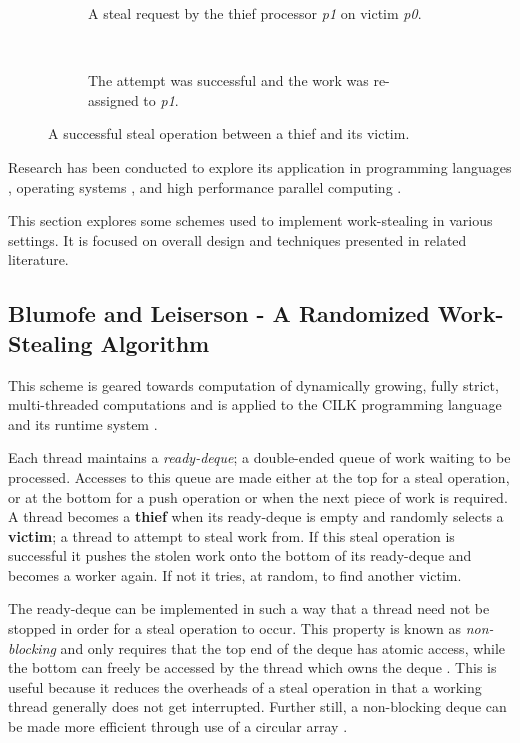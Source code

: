 \begin{figure}[h]
\centering
\begin{subfigure}[b]{0.4\textwidth}
  \centering    
  
  \caption{
    \tiny A steal request by the thief processor \textit{p1} on victim \textit{p0}.
  }
  \label{fig:stealreq}
\end{subfigure}
~~~~~~ %
\begin{subfigure}[b]{0.4\textwidth}
  \centering
  
  \caption{
    \tiny The attempt was successful and the work was re-assigned to \textit{p1}.
  }
  \label{fig:stealsuccess}
\end{subfigure}
\caption{
    A successful steal operation between a thief and its victim.
  }
\label{fig:stealoperation}
\end{figure}

Research has been conducted to explore its application in programming languages \cite{}, 
operating systems \cite{}, and high performance parallel computing \cite{}.

This section explores some schemes used to implement work-stealing in various settings. It is focused on overall design and 
techniques presented in related literature. 

\subsection*{Blumofe and Leiserson - A Randomized Work-Stealing Algorithm}
\label{sec:randscheme}

This scheme is geared towards computation of dynamically growing, fully strict, multi-threaded computations and is applied to the CILK
programming language and its runtime system \cite{blumleis}. 

Each thread maintains a \textit{ready-deque}; a double-ended queue of work waiting to be processed. 
Accesses to this queue are made either at the top for a steal operation, or at the bottom for a push operation
or when the next piece of work is required.
A thread becomes a \textbf{thief} when its ready-deque is empty and randomly selects a \textbf{victim}; a thread
to attempt to steal work from. If this steal operation is successful it pushes the stolen work 
onto the bottom of its ready-deque and becomes a worker again. If not it tries, at random, to find another victim.

The ready-deque can be implemented in such a way that a thread need not be stopped in order for a steal operation 
to occur. This property is known as \textit{non-blocking} and only requires that the top end of the deque has atomic access,
while the bottom can freely be accessed by the thread which owns the deque \cite{narora}. This is useful because it reduces the overheads 
of a steal operation in that a working thread generally does not get interrupted. 
Further still, a non-blocking deque can be made more efficient through use of a circular array \cite{circdeque}.

